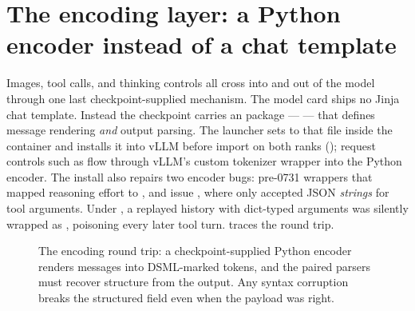 \section{The encoding layer: a Python encoder instead of a chat template}
\label{sec:model-encoding}

Images, tool calls, and thinking controls all cross into and out of the
model through one last checkpoint-supplied mechanism.
The model card ships no Jinja chat template. Instead the checkpoint carries an
 package ---  --- that
defines message rendering \emph{and} output parsing. The launcher sets
 to that file inside the container and installs
it into vLLM before import on both ranks ();
request controls such as  flow through
vLLM's custom tokenizer wrapper into the Python encoder. The install also
repairs two encoder bugs: pre-0731 wrappers that mapped  reasoning
effort to , and issue , where
 only accepted JSON \emph{strings} for tool
arguments. Under , a replayed history with dict-typed arguments
was silently wrapped as , poisoning every later
tool turn.
 traces the round trip.

\begin{figure}[htbp]
\centering
{}
\caption{The encoding round trip: a checkpoint-supplied Python encoder renders
messages into DSML-marked tokens, and the paired  parsers
must recover structure from the output. Any syntax corruption breaks the
structured  field even when the payload was right.}
\label{fig:dsml-flow}
\end{figure}

